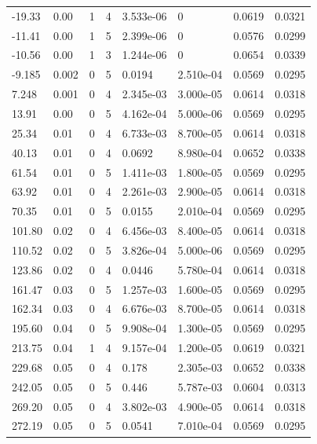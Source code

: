 \documentclass[preview]{standalone}
\begin{document}
{{\begin{tabular}{L{1.2cm}C{1.2cm} C{0.3cm}C{0.5cm} C{1.4cm}C{1.4cm} C{1.4cm}C{1.4cm}}
  -19.33  &  0.00  & 1     &  4 &  3.533e-06  & 0  & 0.0619 &  0.0321   \\ 
  -11.41  &  0.00  & 1     &  5 &  2.399e-06  & 0  & 0.0576 &  0.0299   \\ 
  -10.56  &  0.00  & 1     &  3 &  1.244e-06  & 0  & 0.0654 &  0.0339   \\ 
  -9.185  &  0.002  & 0     &  5 &  0.0194  & 2.510e-04  & 0.0569 &  0.0295   \\ 
  7.248  &  0.001  & 0     &  4 &  2.345e-03  & 3.000e-05  & 0.0614 &  0.0318   \\ 
  13.91  &  0.00  & 0     &  5 &  4.162e-04  & 5.000e-06  & 0.0569 &  0.0295   \\ 
  25.34  &  0.01  & 0     &  4 &  6.733e-03  & 8.700e-05  & 0.0614 &  0.0318   \\ 
  40.13  &  0.01  & 0     &  4 &  0.0692  & 8.980e-04  & 0.0652 &  0.0338   \\ 
  61.54  &  0.01  & 0     &  5 &  1.411e-03  & 1.800e-05  & 0.0569 &  0.0295   \\ 
  63.92  &  0.01  & 0     &  4 &  2.261e-03  & 2.900e-05  & 0.0614 &  0.0318   \\ 
  70.35  &  0.01  & 0     &  5 &  0.0155  & 2.010e-04  & 0.0569 &  0.0295   \\ 
  101.80  &  0.02  & 0     &  4 &  6.456e-03  & 8.400e-05  & 0.0614 &  0.0318   \\ 
  110.52  &  0.02  & 0     &  5 &  3.826e-04  & 5.000e-06  & 0.0569 &  0.0295   \\ 
  123.86  &  0.02  & 0     &  4 &  0.0446  & 5.780e-04  & 0.0614 &  0.0318   \\ 
  161.47  &  0.03  & 0     &  5 &  1.257e-03  & 1.600e-05  & 0.0569 &  0.0295   \\ 
  162.34  &  0.03  & 0     &  4 &  6.676e-03  & 8.700e-05  & 0.0614 &  0.0318   \\ 
  195.60  &  0.04  & 0     &  5 &  9.908e-04  & 1.300e-05  & 0.0569 &  0.0295   \\ 
  213.75  &  0.04  & 1     &  4 &  9.157e-04  & 1.200e-05  & 0.0619 &  0.0321   \\ 
  229.68  &  0.05  & 0     &  4 &  0.178  & 2.305e-03  & 0.0652 &  0.0338   \\ 
  242.05  &  0.05  & 0     &  5 &  0.446  & 5.787e-03  & 0.0604 &  0.0313   \\ 
  269.20  &  0.05  & 0     &  4 &  3.802e-03  & 4.900e-05  & 0.0614 &  0.0318   \\ 
  272.19  &  0.05  & 0     &  5 &  0.0541  & 7.010e-04  & 0.0569 &  0.0295   \\ 

\end{tabular}}}
\end{document}
